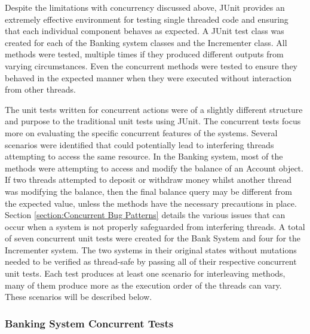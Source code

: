 \documentclass[a4paper,12pt]{article}
\begin{document}
Despite the limitations with concurrency discussed above, JUnit provides an extremely effective environment for testing single threaded code and ensuring that each individual component behaves as expected. A JUnit test class was created for each of the Banking system classes and the Incrementer class. All methods were tested, multiple times if they produced different outputs from varying circumstances. Even the concurrent methods were tested to ensure they behaved in the expected manner when they were executed without interaction from other threads. 

The unit tests written for concurrent actions were of a slightly different structure and purpose to the traditional unit tests using JUnit. The concurrent tests focus more on evaluating the specific concurrent features of the systems. Several scenarios were identified that could potentially lead to interfering threads attempting to access the same resource. In the Banking system, most of the methods were attempting to access and modify the balance of an Account object. If two threads attempted to deposit or withdraw money whilst another thread was modifying the balance, then the final balance query may be different from the expected value, unless the methods have the necessary precautions in place. Section \ref{section:Concurrent Bug Patterns} details the various issues that can occur when a system is not properly safeguarded from interfering threads. A total of seven concurrent unit tests were created for the Bank System and four for the Incrementer system. The two systems in their original states without mutations needed to be verified as thread-safe by passing all of their respective concurrent unit tests. Each test produces at least one scenario for interleaving methods, many of them produce more as the execution order of the threads can vary. These scenarios will be described below.   

\subsubsection{Banking System Concurrent Tests}
\end{document}
